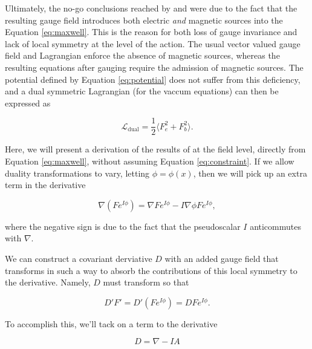\documentclass{article}
\begin{document}
  Ultimately, the no-go conclusions reached by \cite{bunster} and \cite{deser} were due to the fact that the resulting gauge field introduces both electric \emph{and} magnetic sources into the Equation \ref{eq:maxwell}. This is the reason for both loss of gauge invariance and lack of local symmetry at the level of the action. The usual vector valued gauge field and Lagrangian enforce the absence of magnetic sources, whereas the resulting equations after gauging require the admission of magnetic sources. The potential defined by Equation \ref{eq:potential} does not suffer from this deficiency, and a dual symmetric Lagrangian (for the vaccum equations) can then be expressed as\cite{dressel}

  \begin{equation}
    \mathcal{L}_{\text{dual}} = \frac{1}{2}\langle F_e^2 + F_b^2 \rangle.
  \end{equation}

  Here, we will present a derivation of the results of \cite{tiwari} at the field level, directly from Equation \ref{eq:maxwell}, without assuming Equation \ref{eq:constraint}. If we allow duality transformations to vary, letting $\phi = \phi(x)$, then we will pick up an extra term in the derivative

  \begin{equation}
    \nabla (F e^{I \phi}) = \nabla F e^{I \phi} - I \nabla \phi F e^{I\phi},
  \end{equation}

  where the negative sign is due to the fact that the pseudoscalar $I$ anticommutes with $\nabla$.

  We can construct a covariant derviative $D$ with an added gauge field that transforms in such a way to absorb the contributions of this local symmetry to the derivative. Namely, $D$ must transform so that

  \begin{equation}
    D' F' = D' (F e^{I \phi}) = D F e^{I \phi}. \label{eq:covariant}
  \end{equation}


  To accomplish this, we'll tack on a term to the derivative

  \begin{equation}
    D = \nabla - I A
  \end{equation}
\end{document}
